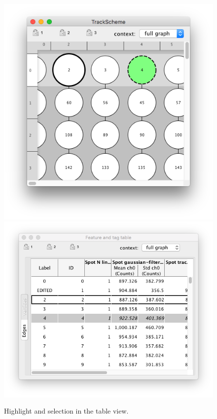 \begin{figure}
    \centering
    \null\hfill
    \includegraphics[height=0.23\textheight]{figures/Mastodon_TableView5.png}
    \hfill
    \includegraphics[height=0.23\textheight]{figures/Mastodon_TableView6.png}
    \hfill\null
    
    \caption{Highlight and selection in the table view.  }
    \label{fig:TableViewHighlightSelection}
\end{figure}


